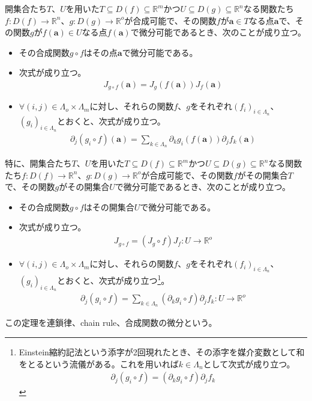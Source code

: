 \documentclass[dvipdfmx]{jsarticle}
\begin{document}
\begin{thm}[連鎖律]\label{4.2.6.8}
開集合たち$T$、$U$を用いた$T \subseteq D(f) \subseteq \mathbb{R}^{m}$かつ$U \subseteq D(g) \subseteq \mathbb{R}^{n}$なる関数たち$f:D(f) \rightarrow \mathbb{R}^{n}$、$g:D(g) \rightarrow \mathbb{R}^{o}$が合成可能で、その関数$f$が$\mathbf{a} \in T$なる点$\mathbf{a}$で、その関数$g$が$f\left( \mathbf{a} \right) \in U$なる点$f\left( \mathbf{a} \right)$で微分可能であるとき、次のことが成り立つ。
\begin{itemize}
\item
  その合成関数$g \circ f$はその点$\mathbf{a}$で微分可能である。
\item
  次式が成り立つ。
\begin{align*}
J_{g \circ f}\left( \mathbf{a} \right) = J_{g}\left( f\left( \mathbf{a} \right) \right)J_{f}\left( \mathbf{a} \right)
\end{align*}
\item
  $\forall(i,j) \in \varLambda_{o} \times \varLambda_{m}$に対し、それらの関数$f$、$g$をそれぞれ$\left( f_{i} \right)_{i \in \varLambda_{n}}$、$\left( g_{i} \right)_{i \in \varLambda_{n}}$とおくと、次式が成り立つ。
\begin{align*}
\partial_{j}\left( g_{i} \circ f \right)\left( \mathbf{a} \right) = \sum_{k \in \varLambda_{n}} {\partial_{k}g_{i}\left( f\left( \mathbf{a} \right) \right)\partial_{j}f_{k}}\left( \mathbf{a} \right)
\end{align*}
\end{itemize}\par
特に、開集合たち$T$、$U$を用いた$T \subseteq D(f) \subseteq \mathbb{R}^{m}$かつ$U \subseteq D(g) \subseteq \mathbb{R}^{n}$なる関数たち$f:D(f) \rightarrow \mathbb{R}^{n}$、$g:D(g) \rightarrow \mathbb{R}^{o}$が合成可能で、その関数$f$がその開集合$T$で、その関数$g$がその開集合$U$で微分可能であるとき、次のことが成り立つ。
\begin{itemize}
\item
  その合成関数$g \circ f$はその開集合$U$で微分可能である。
\item
  次式が成り立つ。
\begin{align*}
J_{g \circ f} = \left( J_{g} \circ f \right)J_{f}:U \rightarrow \mathbb{R}^{o}
\end{align*}
\item
  $\forall(i,j) \in \varLambda_{o} \times \varLambda_{m}$に対し、それらの関数$f$、$g$をそれぞれ$\left( f_{i} \right)_{i \in \varLambda_{n}}$、$\left( g_{i} \right)_{i \in \varLambda_{n}}$とおくと、次式が成り立つ\footnote{Einstein縮約記法という添字が2回現れたとき、その添字を媒介変数として和をとるという流儀がある。これを用いれば$k \in \varLambda_{n}$として次式が成り立つ。
\begin{align*}
\partial_{j}\left( g_{i} \circ f \right) = \left( \partial_{k}g_{i} \circ f \right)\partial_{j}f_{k}
\end{align*}}。
\begin{align*}
\partial_{j}\left( g_{i} \circ f \right) = \sum_{k \in \varLambda_{n}} {\left( \partial_{k}g_{i} \circ f \right)\partial_{j}f_{k}}:U \rightarrow \mathbb{R}^{o}
\end{align*}
\end{itemize}
この定理を連鎖律、chain rule、合成関数の微分という。
\end{thm}
\end{document}
